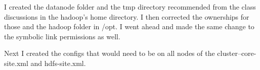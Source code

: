 \documentclass[10pt]{article}
\begin{document}
\hfill
{}%
\par
I created the datanode folder and the tmp directory recommended from the class discussions in the hadoop's home directory. I then corrected the ownerships for those and the hadoop folder in /opt. I went ahead and made the same change to the symbolic link permissions as well.
\par
{}%
\hfill
{}%
\par
Next I created the configs that would need to be on all nodes of the cluster--core-site.xml and hdfs-site.xml.
\par
{}%
\end{document}
